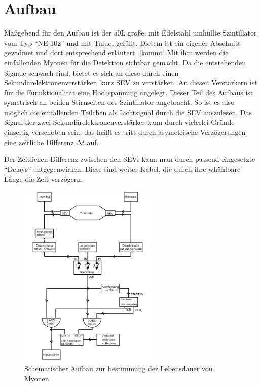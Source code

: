 \section{Aufbau}

\begin{minipage}{0.5\textwidth}
Maßgebend für den Aufbau ist der $50 \si{\liter}$ große, mit Edelstahl umhüllte Szintillator vom Typ \enquote{NE 102} und mit Tuluol gefüllt. Diesem ist ein eigener Abschnitt gewidmet und dort entsprechend erläutert. \ref{kommt}
Mit ihm werden die einfallenden Myonen für die Detektion sichtbar gemacht. Da die entstehenden Signale schwach sind, bietet es sich an diese durch einen Sekundärelektronenverstärker, kurz SEV zu verstärken. An diesen Verstärkern ist für
die Funnktionalität eine Hochspannung angelegt. Dieser Teil des Aufbaus ist symetrisch an beiden Stirnseiten des Szintillator angebracht. So ist es also möglich die einfallenden Teilchen als Lichtsignal durch die SEV auszulesen.
Das Signal der zwei Sekundärelektronenverstärker kann durch vielerlei Gründe einseitig verschoben sein, das heißt es tritt durch asymetrische Verzögerungen eine zeitliche Differenz $\increment t$ auf.
\end{minipage}
Der Zeitlichen Differenz zwischen den SEVs kann man durch passend eingesetzte \enquote{Delays} entgegenwirken. Diese sind weiter Kabel, die durch ihre whählbare Länge die Zeit verzögern. 
\begin{figure}
    \centering
    \includegraphics[width=0.6\textwidth]{bilder/aufbau.png}
    \caption{Schematischer Aufbau zur bestimmung der Lebensdauer von Myonen. \cite{skript}} 
    \label{fig:1}
\end{figure}